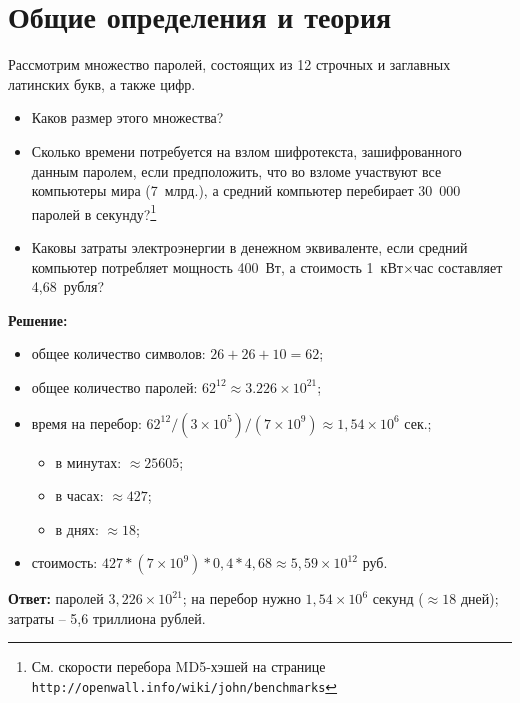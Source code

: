 \section{Общие определения и теория}
\tasksection

\tasknumber Рассмотрим множество паролей, состоящих из 12 строчных и заглавных латинских букв, а также цифр.
\begin{itemize}\itemsep1pt \parskip0pt 
\item Каков размер этого множества?
\item Сколько времени потребуется на взлом шифротекста, зашифрованного данным паролем, если предположить, что во взломе участвуют все компьютеры мира (7~млрд.), а средний компьютер перебирает 30~000 паролей в секунду?\footnote{См. скорости перебора MD5-хэшей на странице \texttt{http://openwall.info\hspace{0pt}/wiki\hspace{0pt}/john\hspace{0pt}/benchmarks}}
\item Каковы затраты электроэнергии в денежном эквиваленте, если средний компьютер потребляет мощность 400~Вт, а стоимость 1~кВт$\times$час составляет 4,68~рубля?
\end{itemize}
\medbreak
\textbf{Решение:}
\begin{itemize}\itemsep1pt \parskip0pt 
	\item общее количество символов: $26 + 26 + 10 = 62$;
	\item общее количество паролей: $62^{12} \approx 3.226\times 10^{21}$;
	\item время на перебор: $62^{12} / (3 \times 10^5) / (7 \times 10^9 ) \approx 1,54 \times 10^{6}$ сек.;
	\begin{itemize}\itemsep1pt \parskip0pt 
		\item в минутах: $\approx 25605$;
		\item в часах: $\approx 427$;
		\item в днях: $\approx 18$;
	\end{itemize}
	\item стоимость: $427 * (7 \times 10^9 ) * 0,4 * 4,68 \approx 5,59 \times 10^{12}$ руб.
\end{itemize}
\medbreak
\textbf{Ответ:} паролей $3,226 \times 10^{21}$; на перебор нужно $1,54 \times 10^6$ секунд ($\approx 18$ дней); затраты -- 5,6 триллиона рублей.
\bigbreak

